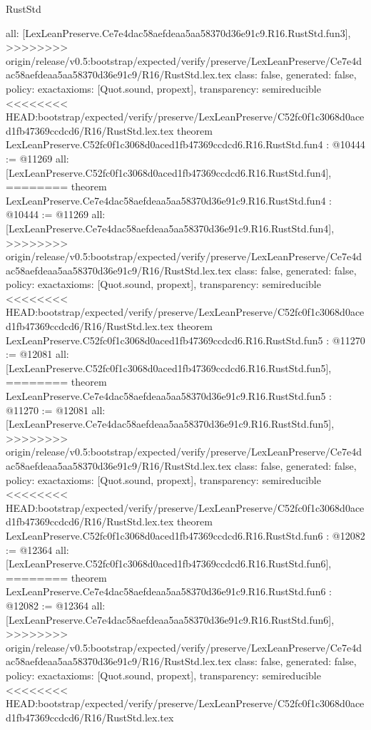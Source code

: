\begin{lexlean}{RustStd}
\begin{coremodule}
{\begin{coremodule}
{{{{{{{  all: [LexLeanPreserve.Ce7e4dac58aefdeaa5aa58370d36e91c9.R16.RustStd.fun3],
>>>>>>>> origin/release/v0.5:bootstrap/expected/verify/preserve/LexLeanPreserve/Ce7e4dac58aefdeaa5aa58370d36e91c9/R16/RustStd.lex.tex
  class: false,
  generated: false,
  policy: exact{axioms: [Quot.sound, propext]},
  transparency: semireducible
}
<<<<<<<< HEAD:bootstrap/expected/verify/preserve/LexLeanPreserve/C52fc0f1c3068d0aced1fb47369ccdcd6/R16/RustStd.lex.tex
theorem LexLeanPreserve.C52fc0f1c3068d0aced1fb47369ccdcd6.R16.RustStd.fun4 : @10444 := @11269 {
  all: [LexLeanPreserve.C52fc0f1c3068d0aced1fb47369ccdcd6.R16.RustStd.fun4],
========
theorem LexLeanPreserve.Ce7e4dac58aefdeaa5aa58370d36e91c9.R16.RustStd.fun4 : @10444 := @11269 {
  all: [LexLeanPreserve.Ce7e4dac58aefdeaa5aa58370d36e91c9.R16.RustStd.fun4],
>>>>>>>> origin/release/v0.5:bootstrap/expected/verify/preserve/LexLeanPreserve/Ce7e4dac58aefdeaa5aa58370d36e91c9/R16/RustStd.lex.tex
  class: false,
  generated: false,
  policy: exact{axioms: [Quot.sound, propext]},
  transparency: semireducible
}
<<<<<<<< HEAD:bootstrap/expected/verify/preserve/LexLeanPreserve/C52fc0f1c3068d0aced1fb47369ccdcd6/R16/RustStd.lex.tex
theorem LexLeanPreserve.C52fc0f1c3068d0aced1fb47369ccdcd6.R16.RustStd.fun5 : @11270 := @12081 {
  all: [LexLeanPreserve.C52fc0f1c3068d0aced1fb47369ccdcd6.R16.RustStd.fun5],
========
theorem LexLeanPreserve.Ce7e4dac58aefdeaa5aa58370d36e91c9.R16.RustStd.fun5 : @11270 := @12081 {
  all: [LexLeanPreserve.Ce7e4dac58aefdeaa5aa58370d36e91c9.R16.RustStd.fun5],
>>>>>>>> origin/release/v0.5:bootstrap/expected/verify/preserve/LexLeanPreserve/Ce7e4dac58aefdeaa5aa58370d36e91c9/R16/RustStd.lex.tex
  class: false,
  generated: false,
  policy: exact{axioms: [Quot.sound, propext]},
  transparency: semireducible
}
<<<<<<<< HEAD:bootstrap/expected/verify/preserve/LexLeanPreserve/C52fc0f1c3068d0aced1fb47369ccdcd6/R16/RustStd.lex.tex
theorem LexLeanPreserve.C52fc0f1c3068d0aced1fb47369ccdcd6.R16.RustStd.fun6 : @12082 := @12364 {
  all: [LexLeanPreserve.C52fc0f1c3068d0aced1fb47369ccdcd6.R16.RustStd.fun6],
========
theorem LexLeanPreserve.Ce7e4dac58aefdeaa5aa58370d36e91c9.R16.RustStd.fun6 : @12082 := @12364 {
  all: [LexLeanPreserve.Ce7e4dac58aefdeaa5aa58370d36e91c9.R16.RustStd.fun6],
>>>>>>>> origin/release/v0.5:bootstrap/expected/verify/preserve/LexLeanPreserve/Ce7e4dac58aefdeaa5aa58370d36e91c9/R16/RustStd.lex.tex
  class: false,
  generated: false,
  policy: exact{axioms: [Quot.sound, propext]},
  transparency: semireducible
}
<<<<<<<< HEAD:bootstrap/expected/verify/preserve/LexLeanPreserve/C52fc0f1c3068d0aced1fb47369ccdcd6/R16/RustStd.lex.tex
}}}}}}}}}
\end{coremodule}}
\end{coremodule}
\end{lexlean}

